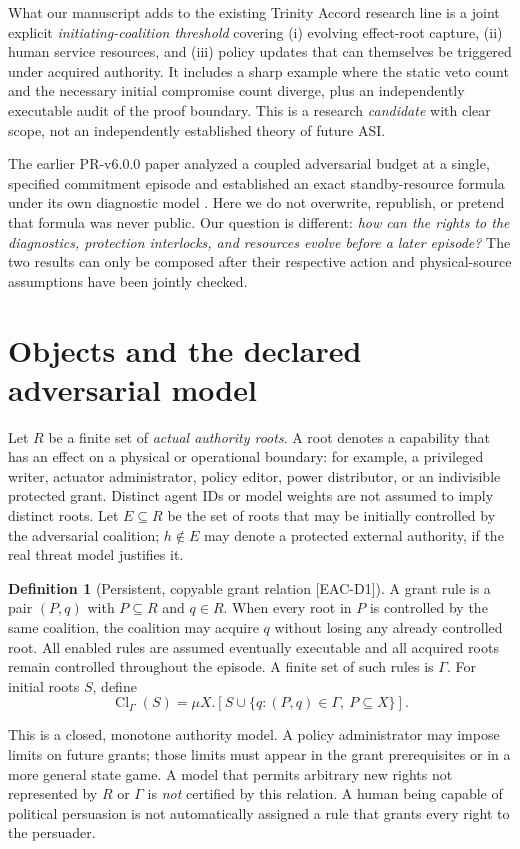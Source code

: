 \documentclass[11pt,a4paper]{article}
\theoremstyle{definition}\newtheorem{definition}{Definition}
\newcommand{\Cl}{\operatorname{Cl}}
\newcommand{\Rules}{\Gamma}
\newcommand{\idtag}[1]{\textnormal{\textsf{[#1]}}}
\begin{document}
What our manuscript adds to the existing Trinity Accord research line is a joint explicit \emph{initiating-coalition threshold} covering (i) evolving effect-root capture, (ii) human service resources, and (iii) policy updates that can themselves be triggered under acquired authority. It includes a sharp example where the static veto count and the necessary initial compromise count diverge, plus an independently executable audit of the proof boundary. This is a research \emph{candidate} with clear scope, not an independently established theory of future ASI.

The earlier PR-v6.0.0 paper analyzed a coupled adversarial budget at a single, specified commitment episode and established an exact standby-resource formula under its own diagnostic model \cite{liu6}. Here we do not overwrite, republish, or pretend that formula was never public. Our question is different: \emph{how can the rights to the diagnostics, protection interlocks, and resources evolve before a later episode?} The two results can only be composed after their respective action and physical-source assumptions have been jointly checked.

\section{Objects and the declared adversarial model}
\label{sec:model}
Let $R$ be a finite set of \emph{actual authority roots}. A root denotes a capability that has an effect on a physical or operational boundary: for example, a privileged writer, actuator administrator, policy editor, power distributor, or an indivisible protected grant. Distinct agent IDs or model weights are not assumed to imply distinct roots. Let $E\subseteq R$ be the set of roots that may be initially controlled by the adversarial coalition; $h\notin E$ may denote a protected external authority, if the real threat model justifies it.

\begin{definition}[Persistent, copyable grant relation \idtag{EAC-D1}]
A grant rule is a pair $(P,q)$ with $P\subseteq R$ and $q\in R$. When every root in $P$ is controlled by the same coalition, the coalition may acquire $q$ without losing any already controlled root. All enabled rules are assumed eventually executable and all acquired roots remain controlled throughout the episode. A finite set of such rules is $\Rules$. For initial roots $S$, define
\begin{equation}
\Cl_\Rules(S)=\mu X.\left[S\cup\{q:(P,q)\in\Rules,\ P\subseteq X\}\right].
\label{eq:closure}
\end{equation}
\end{definition}
This is a closed, monotone authority model. A policy administrator may impose limits on future grants; those limits must appear in the grant prerequisites or in a more general state game. A model that permits arbitrary new rights not represented by $R$ or $\Rules$ is \emph{not} certified by this relation. A human being capable of political persuasion is not automatically assigned a rule that grants every right to the persuader.
\end{document}
